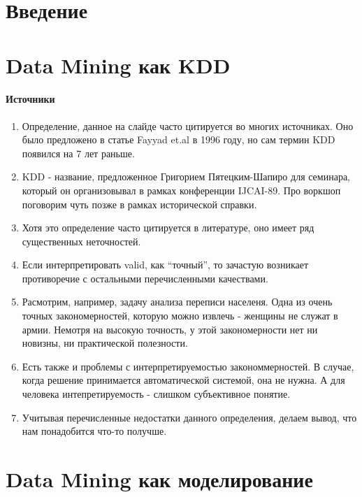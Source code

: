 \documentclass[10pt,a4paper]{article}
\author{Nikolay Anokhin}
\begin{document}
\section{Введение}


\section{Data Mining как KDD}

\paragraph{Источники} \cite{journeys} \cite{kdd89} \cite{critic}

\begin{enumerate}
\item Определение, данное на слайде часто цитируется во многих источниках. Оно было предложено в статье Fayyad et.al в 1996 году, но сам термин KDD появился на 7 лет раньше.
\item KDD - название, предложенное Григорием Пятецким-Шапиро для семинара, который он организовывал в рамках конференции IJCAI-89. Про воркшоп поговорим чуть позже в рамках исторической справки.
\item Хотя это определение часто цитируется в литературе, оно имеет ряд существенных неточностей.
\item Если интерпретировать valid, как ``точный'', то зачастую возникает противоречие с остальными перечисленными качествами.
\item Расмотрим, например, задачу анализа переписи населеня. Одна из очень точных закономерностей, которую можно извлечь - женщины не служат в армии. Немотря на высокую точность, у этой закономерности нет ни новизны, ни практической полезности.
\item Есть также и проблемы с интерпретируемостью закономмерностей. В случае, когда решение принимается автоматической системой, она не нужна. А для человека интепретируемость - слишком субъективное понятие.
\item Учитывая перечисленные недостатки данного определения, делаем вывод, что нам понадобится что-то получше.
\end{enumerate}


\section{Data Mining как моделирование}
\end{document}
